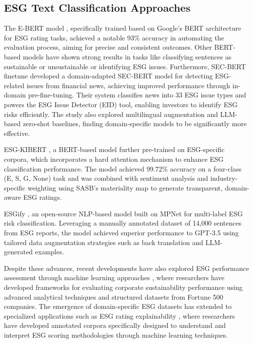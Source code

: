 \documentclass[12pt, letterpaper]{template}
\begin{document}
\subsection{ESG Text Classification Approaches}
The E-BERT model \citep{ebert}, specifically trained based on Google's BERT architecture for ESG rating tasks, achieved a notable 93\% accuracy in automating the evaluation process, aiming for precise and consistent outcomes. Other BERT-based models have shown strong results in tasks like classifying sentences as sustainable or unsustainable or identifying ESG issues. Furthermore, SEC-BERT finetune \citep{sec-bert-ft} developed a domain-adapted SEC-BERT \citep{sec-bert} model for detecting ESG-related issues from financial news, achieving improved performance through in-domain pre-fine-tuning. Their system classifies news into 33 ESG issue types and powers the ESG Issue Detector (EID) tool, enabling investors to identify ESG risks efficiently. The study also explored multilingual augmentation and LLM-based zero-shot baselines, finding domain-specific models to be significantly more effective.

ESG-KIBERT \citep{esg-kibert}, a BERT-based model further pre-trained on ESG-specific corpora, which incorporates a hard attention mechanism to enhance ESG classification performance. The model achieved 99.72\% accuracy on a four-class (E, S, G, None) task and was combined with sentiment analysis and industry-specific weighting using SASB’s materiality map to generate transparent, domain-aware ESG ratings.

ESGify \citep{esgify}, an open-source NLP-based model built on MPNet \citep{mpnet} for multi-label ESG risk classification. Leveraging a manually annotated dataset of 14,000 sentences from ESG reports, the model achieved superior performance to GPT-3.5 using tailored data augmentation strategies such as back translation and LLM-generated examples.

Despite these advances, recent developments have also explored ESG performance assessment through machine learning approaches \citep{Jiang2024}, where researchers have developed frameworks for evaluating corporate sustainability performance using advanced analytical techniques and structured datasets from Fortune 500 companies. The emergence of domain-specific ESG datasets has extended to specialized applications such as ESG rating explainability \citep{DelVitto2023}, where researchers have developed annotated corpora specifically designed to understand and interpret ESG scoring methodologies through machine learning techniques. 
\end{document}
